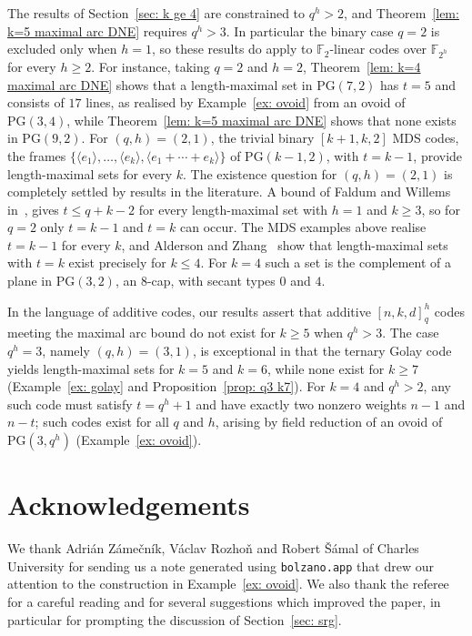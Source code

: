 \documentclass[12pt, twoside]{article}
\begin{document}
	
	The results of Section~\ref{sec: k ge 4} are constrained to $q^h>2$, and Theorem~\ref{lem: k=5 maximal arc DNE} requires $q^h>3$. In particular the binary case $q=2$ is excluded only when $h=1$, so these results do apply to $\mathbb{F}_2$-linear codes over $\mathbb{F}_{2^h}$ for every $h\ge2$. For instance, taking $q=2$ and $h=2$, Theorem~\ref{lem: k=4 maximal arc DNE} shows that a length-maximal set in $\mathrm{PG}(7,2)$ has $t=5$ and consists of $17$ lines, as realised by Example~\ref{ex: ovoid} from an ovoid of $\mathrm{PG}(3,4)$, while Theorem~\ref{lem: k=5 maximal arc DNE} shows that none exists in $\mathrm{PG}(9,2)$.  For   $(q,h)=(2,1)$, the trivial binary $[k+1,k,2]$ MDS codes, the frames $\{\langle e_1\rangle,\ldots,\langle e_k\rangle,\langle e_1+\cdots+e_k\rangle\}$ of $\mathrm{PG}(k-1,2)$, with $t=k-1$, provide length-maximal sets for every $k$. The existence question for $(q,h)=(2,1)$ is completely settled by results in the literature. A bound of Faldum and Willems in~\cite{AZ}, gives $t \le q+k-2$ for every length-maximal set with $h=1$ and $k\ge3$, so for $q=2$ only $t=k-1$ and $t=k$ can occur. The MDS examples above realise $t=k-1$ for every $k$, and Alderson and Zhang~\cite{AZ} show that length-maximal sets with $t=k$ exist precisely for $k\le4$. For $k=4$ such a set is the complement of a plane in $\mathrm{PG}(3,2)$, an $8$-cap, with secant types $0$ and $4$.

	In the language of additive codes, our results assert that additive $[n,k,d]_{q}^h$ codes meeting the maximal arc bound do not exist for $k \geq 5$ when $q^h > 3$. The case $q^h=3$, namely $(q,h)=(3,1)$, is exceptional in that the ternary Golay code yields length-maximal sets for $k=5$ and $k=6$, while none exist for $k\ge7$ (Example~\ref{ex: golay} and Proposition~\ref{prop: q3 k7}). For $k=4$ and $q^h > 2$, any such code must satisfy $t=q^h+1$ and have exactly two nonzero weights $n-1$ and $n-t$; such codes exist for all $q$ and $h$, arising by field reduction of an ovoid of $\mathrm{PG}(3,q^h)$ (Example~\ref{ex: ovoid}).

	\section*{Acknowledgements}

	We thank Adri\'an Z\'ame\v{c}n\'ik, V\'aclav Rozho\v{n} and Robert \v{S}\'amal of Charles University for sending us a note generated using \texttt{bolzano.app} that drew our attention to the construction in Example~\ref{ex: ovoid}. We also thank the referee for a careful reading and for several suggestions which improved the paper, in particular for prompting the discussion of Section~\ref{sec: srg}.
\end{document}
